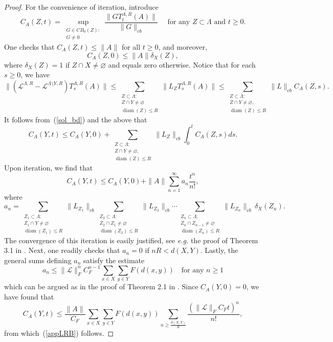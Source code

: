\documentclass{article}
\DeclareMathOperator{\diam}{diam}
\newcommand{\lind}{\mathscr{L}}
\newcommand{\<}{\langle}
\renewcommand{\>}{\rangle}
\let\emptyset\varnothing
\numberwithin{equation}{section}
\theoremstyle{definition}
\begin{document}
\begin{proof}
    For the convenience of iteration, introduce 
    \begin{equation}
        C_A(Z,t) = \sup_{\substack{G\in CB_0(Z):\\ G\neq 0}} \frac{\|GT^{\Lambda,R}_t(A)\|}{\|G\|_{cb}} \quad\text{ for any $Z\subset \Lambda$ and $t\ge 0$.}
    \end{equation}
   One checks that $C_A(Z,t)\le \|A\|$ for all $t\ge 0$, and moreover, 
    \[
        C_A(Z,0)\le \|A\| \delta_X(Z),
    \] where $\delta_X(Z) = 1$ if $Z\cap X \neq \emptyset$ and equals zero otherwise.  Notice that for each $s\ge 0$, we have 
    \[
        \|(\lind^{\Lambda,R}- \lind^{\Lambda \setminus Y, R})T^{\Lambda,R}_s(A)\| \le \sum_{\substack{Z\subset \Lambda: \\ Z\cap Y \neq \emptyset\\ \diam(Z)\le R}} \|L_ZT^{\Lambda, R}_s(A)\| \le \sum_{\substack{Z\subset \Lambda:\\ Z\cap Y \neq \emptyset,\\\diam(Z)\le R}}\|L\|_{cb}C_A(Z,s).
    \] It follows from~(\ref{sol_bd}) and the above that
    \[
        C_A(Y,t) \le C_A(Y,0) + \sum_{\substack{Z\subset \Lambda:\\ Z\cap Y\neq \emptyset,\\ \diam(Z)\le R}} \|L_Z\|_{cb}\int_0^t C_A(Z,s)ds.
    \]  Upon iteration, we find that 
    \begin{equation}
        C_A(Y,t) \le C_A(Y,0) + \|A\| \sum_{n=1}^\infty a_n \frac{t^n}{n!},
    \end{equation} where 
    \begin{equation}
        a_n = \sum_{\substack{Z_1\subset \Lambda:\\ Z_1\cap Y \neq \emptyset\\ \diam(Z_1)\le R}}\|L_{Z_1}\|_{cb} \sum_{\substack{Z_2\subset \Lambda:\\ Z_2\cap Z_1 \neq \emptyset\\ \diam(Z_2)\le R}}\|L_{Z_2}\|_{cb}\cdots \sum_{\substack{Z_n\subset \Lambda:\\ Z_n\cap Z_{n-1} \neq \emptyset\\ \diam(Z_n)\le R}}\|L_{Z_n}\|_{cb} \, \delta_X(Z_n).
    \end{equation} 
    The convergence of this iteration is easily justified, see \textit{e.g.} the proof of Theorem 3.1 in \cite{NachtergaeleSimsYoung}.  
    Next, one readily checks that $a_n = 0$ if $nR<d(X,Y)$.  Lastly, the general sums defining $a_n$ satisfy the estimate 
    \begin{equation}
        a_n \le \| \mathscr{L}\|_F^n C_F^{n-1} \sum_{x\in X}\sum_{y\in Y}F(d(x,y))\quad \text{for any $n\ge1$}
    \end{equation} 
 which can be argued as in the proof of Theorem 2.1 in \cite{NachtergaeleOgataSims}. 
    Since $C_A(Y,0)=0$, we have found that 
    \[
        C_A(Y,t)\le \frac{\|A\|}{C_F}\sum_{x\in X}\sum_{y\in Y}F(d(x,y)) \sum_{n\ge \frac{d(X,Y)}{R}}\frac{(\| \mathscr{L}\|_F C_F t)^n}{n!},
    \] from which~(\ref{appLRB}) follows. 
\end{proof}
\end{document}

